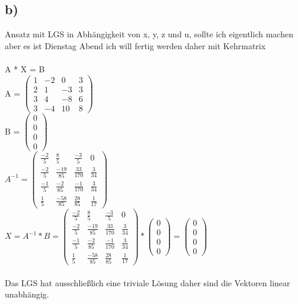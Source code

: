 \documentclass{article}
\begin{document}
	\subsection*{b)}
	Ansatz mit LGS in Abhängigkeit von x, y, z und u, sollte ich eigentlich machen aber es ist Dienstag Abend ich will fertig werden daher mit Kehrmatrix \\ \\
	A * X = B \\
	A = $
	\left(\begin{matrix}
		1 & -2 & 0 & 3 \\
		2 & 1 & -3 & 3 \\
		3 & 4 & -8 & 6 \\
		3 & -4 & 10 & 8
	\end{matrix}\right)
	$ \\
	B = 
	$
	\left(\begin{matrix}
		0 \\
		0 \\
		0 \\
		0
	\end{matrix}\right)	$ \\
	$A^{-1} = 
	\left(\begin{matrix}
	\frac{-2}{5} & \frac{8}{5} & \frac{-3}{5} & 0 \\
	\frac{-2}{5} & \frac{-19}{85} & \frac{33}{170} & \frac{3}{34} \\
	\frac{-1}{5} & \frac{-2}{85} & \frac{-1}{170} & \frac{3}{34} \\
	\frac{1}{5} & \frac{-58}{85} & \frac{28}{85} & \frac{1}{17}
	\end{matrix}\right)
	$ \\
	$X = A^{-1} * B =
	\left(\begin{matrix}
	\frac{-2}{5} & \frac{8}{5} & \frac{-3}{5} & 0 \\
	\frac{-2}{5} & \frac{-19}{85} & \frac{33}{170} & \frac{3}{34} \\
	\frac{-1}{5} & \frac{-2}{85} & \frac{-1}{170} & \frac{3}{34} \\
	\frac{1}{5} & \frac{-58}{85} & \frac{28}{85} & \frac{1}{17}
	\end{matrix}\right) * 
	\left(\begin{matrix}
	0 \\
	0 \\
	0 \\
	0
	\end{matrix}\right)
	=
	\left(\begin{matrix}
	0 \\
	0 \\
	0 \\
	0
	\end{matrix}\right)
	$ \\ \\
	Das LGS hat ausschließlich eine triviale Lösung daher sind die Vektoren linear unabhängig.
\end{document}
